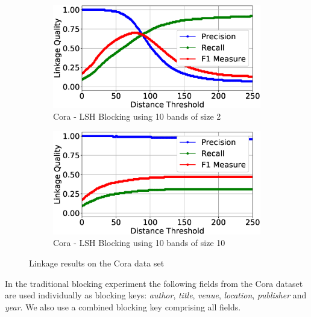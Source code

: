 \documentclass{llncs}
\begin{document}
\begin{figure}
\begin{subfigure}{.5\textwidth}
  \centering
\includegraphics[width=\textwidth]{figures/plotLQ-cora-lsh-10-2}
\caption{Cora - LSH Blocking using 10 bands of size 2}
\end{subfigure}%
\begin{subfigure}{.5\textwidth}
  \centering
\includegraphics[width=\textwidth]{figures/plotLQ-cora-lsh-10-10}
\caption{Cora - LSH Blocking using 10 bands of size 10}
\end{subfigure}


\caption{Linkage results on the Cora data set}
\label{demography-quality-mtree}
\end{figure}


In the traditional blocking experiment the following fields from the
Cora dataset are used individually as blocking keys: \textit{author},
\textit{title}, \textit{venue}, \textit{location}, \textit{publisher}
and \textit{year}. We also use a combined blocking key comprising all
fields.
\end{document}
